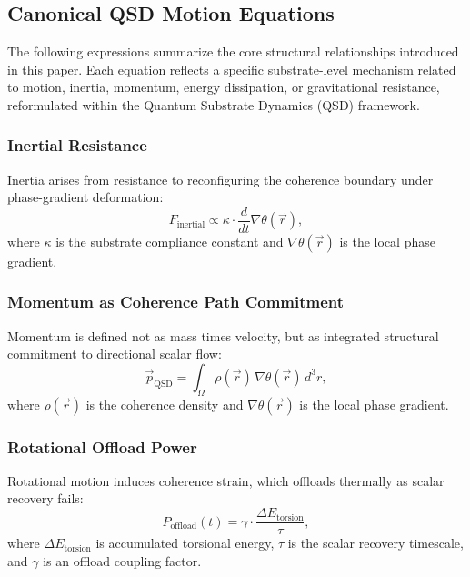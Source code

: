 \documentclass[entropy,article,submit,pdftex,moreauthors]{Definitions/mdpi}
\begin{document}
\section[\appendixname~\thesection]{}
\subsection[\appendixname~\thesubsection]{Canonical QSD Motion Equations}

The following expressions summarize the core structural relationships introduced in this paper. Each equation reflects a specific substrate-level mechanism related to motion, inertia, momentum, energy dissipation, or gravitational resistance, reformulated within the Quantum Substrate Dynamics (QSD) framework.

\subsubsection{Inertial Resistance}
Inertia arises from resistance to reconfiguring the coherence boundary under phase-gradient deformation:
\begin{equation}
    F_{\text{inertial}} \propto \kappa \cdot \frac{d}{dt} \nabla \theta(\vec{r}),
\end{equation}
where \( \kappa \) is the substrate compliance constant and \( \nabla \theta(\vec{r}) \) is the local phase gradient.

\subsubsection{Momentum as Coherence Path Commitment}
Momentum is defined not as mass times velocity, but as integrated structural commitment to directional scalar flow:
\begin{equation}
    \vec{p}_{\text{QSD}} = \int_{\Omega} \rho(\vec{r}) \, \nabla \theta(\vec{r}) \, d^3r,
\end{equation}
where \( \rho(\vec{r}) \) is the coherence density and \( \nabla \theta(\vec{r}) \) is the local phase gradient.

\subsubsection{Rotational Offload Power}
Rotational motion induces coherence strain, which offloads thermally as scalar recovery fails:
\begin{equation}
    P_{\text{offload}}(t) = \gamma \cdot \frac{\Delta E_{\text{torsion}}}{\tau},
\end{equation}
where \( \Delta E_{\text{torsion}} \) is accumulated torsional energy, \( \tau \) is the scalar recovery timescale, and \( \gamma \) is an offload coupling factor.
\end{document}
